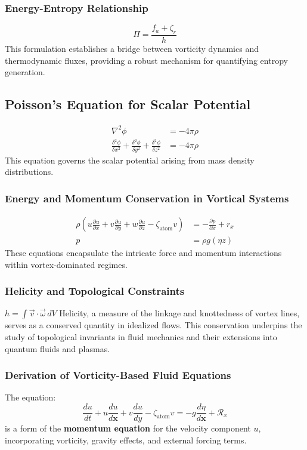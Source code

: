 \documentclass[a4paper,10pt]{article}
\begin{document}
    \subsubsection*{Energy-Entropy Relationship}
    \begin{equation*}
        \Pi = \frac{f_a + \zeta_r}{h}
    \end{equation*}
    This formulation establishes a bridge between vorticity dynamics and thermodynamic fluxes, providing a robust mechanism for quantifying entropy generation.

    \subsection*{Poisson's Equation for Scalar Potential}
    \begin{align}
        \nabla^2 \phi &= -4 \pi \rho \\
        \frac{\delta^2 \phi}{\delta x^2}+\frac{\delta^2 \phi}{\delta y^2}+\frac{\delta^2 \phi}{\delta z^2} &= -4 \pi \rho
    \end{align}
    This equation governs the scalar potential arising from mass density distributions.

    \subsubsection*{Energy and Momentum Conservation in Vortical Systems}
    \begin{align}
        \rho \left( u \frac{\partial u}{\partial x} + v \frac{\partial u}{\partial y} + w \frac{\partial u}{\partial z} - \zeta_\text{atom} v \right) &= -\frac{\partial p}{\partial x} + r_x \\
        p &= \rho g(\eta z)
    \end{align}
    These equations encapsulate the intricate force and momentum interactions within vortex-dominated regimes.


\subsubsection*{Helicity and Topological Constraints}
$h = \int \vec{v} \cdot \vec{\omega} \, dV$
 Helicity, a measure of the linkage and knottedness of vortex lines, serves as a conserved quantity in idealized flows. This conservation underpins the study of topological invariants in fluid mechanics and their extensions into quantum fluids and plasmas.


    \subsubsection*{Derivation of Vorticity-Based Fluid Equations}
    The equation:
    \begin{equation*}
        \frac{d u}{d t}+u \frac{d u}{d \boldsymbol{x}}+v \frac{d u}{d y}-\zeta_{\text {atom}} v=-g \frac{d \eta}{d \boldsymbol{x}}+\mathcal{R}_x
    \end{equation*}
    is a form of the \textbf{momentum equation} for the velocity component $u$, incorporating vorticity, gravity effects, and external forcing terms.
\end{document}

